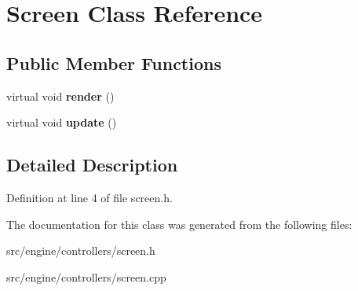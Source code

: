 \section{Screen Class Reference}
\label{class_screen}
\subsection*{Public Member Functions}
\begin{DoxyCompactItemize}
\item 
\mbox{\label{class_screen_a819aa32ece0c9bf2b173e747d8713c0b}} 
virtual void {\bfseries render} ()
\item 
\mbox{\label{class_screen_a0b6fb948f802838e45c45ef04d7e6370}} 
virtual void {\bfseries update} ()
\end{DoxyCompactItemize}


\subsection{Detailed Description}


Definition at line 4 of file screen.\+h.



The documentation for this class was generated from the following files\+:\begin{DoxyCompactItemize}
\item 
src/engine/controllers/screen.\+h\item 
src/engine/controllers/screen.\+cpp\end{DoxyCompactItemize}
